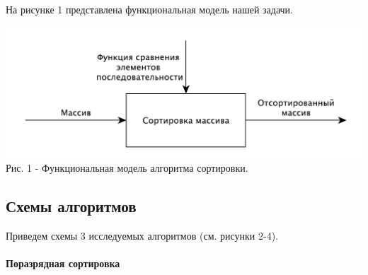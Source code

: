 \documentclass[a4paper,14pt]{article} %
\begin{document}
        На рисунке 1 представлена функциональная модель нашей задачи.  
	\begin{center}
		\includegraphics[scale = 0.8]{idef0} \\ Рис.  1 - Функциональная модель алгоритма сортировки. 
	\end{center}
	
        \subsection{Схемы алгоритмов}
        \hfill
        
        Приведем схемы 3 исследуемых алгоритмов (см. рисунки 2-4). 
        
        \paragraph{Поразрядная сортировка}
        
\end{document}
